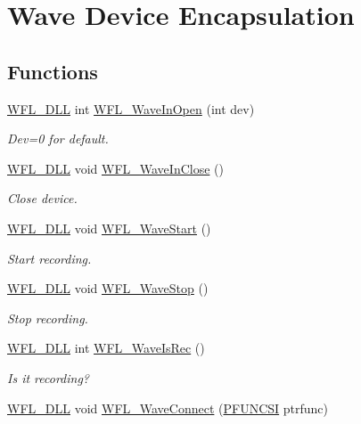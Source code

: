 \hypertarget{group__eee}{\section{Wave Device Encapsulation}
\label{group__eee}
}
\subsection*{Functions}
\begin{DoxyCompactItemize}
\item 
\hyperlink{wflib_8h_a04f24f8cb8df37b828ec454107aeb686}{W\-F\-L\-\_\-\-D\-L\-L} int \hyperlink{group__eee_gaeade7c6a1621ed2180be0e00d8040678}{W\-F\-L\-\_\-\-Wave\-In\-Open} (int dev)
\begin{DoxyCompactList}\small\item\em Dev=0 for default. \end{DoxyCompactList}\item 
\hyperlink{wflib_8h_a04f24f8cb8df37b828ec454107aeb686}{W\-F\-L\-\_\-\-D\-L\-L} void \hyperlink{group__eee_ga9f568eae6cc662e6eea8798c12c2f859}{W\-F\-L\-\_\-\-Wave\-In\-Close} ()
\begin{DoxyCompactList}\small\item\em Close device. \end{DoxyCompactList}\item 
\hyperlink{wflib_8h_a04f24f8cb8df37b828ec454107aeb686}{W\-F\-L\-\_\-\-D\-L\-L} void \hyperlink{group__eee_gaf03a14a34efbfbd846f8a91cfb433521}{W\-F\-L\-\_\-\-Wave\-Start} ()
\begin{DoxyCompactList}\small\item\em Start recording. \end{DoxyCompactList}\item 
\hyperlink{wflib_8h_a04f24f8cb8df37b828ec454107aeb686}{W\-F\-L\-\_\-\-D\-L\-L} void \hyperlink{group__eee_ga569271a5d7751e7c1e203d8a43a14484}{W\-F\-L\-\_\-\-Wave\-Stop} ()
\begin{DoxyCompactList}\small\item\em Stop recording. \end{DoxyCompactList}\item 
\hyperlink{wflib_8h_a04f24f8cb8df37b828ec454107aeb686}{W\-F\-L\-\_\-\-D\-L\-L} int \hyperlink{group__eee_ga3226d844c6cd3219e3f175fa9273ff48}{W\-F\-L\-\_\-\-Wave\-Is\-Rec} ()
\begin{DoxyCompactList}\small\item\em Is it recording? \end{DoxyCompactList}\item 
\hyperlink{wflib_8h_a04f24f8cb8df37b828ec454107aeb686}{W\-F\-L\-\_\-\-D\-L\-L} void \hyperlink{group__eee_ga0cfb3df52a80c158d32a9a14e348c585}{W\-F\-L\-\_\-\-Wave\-Connect} (\hyperlink{group__aaa_ga7e349c93ace11348420a92541037633f}{P\-F\-U\-N\-C\-S\-I} ptrfunc)
\end{DoxyCompactItemize}


